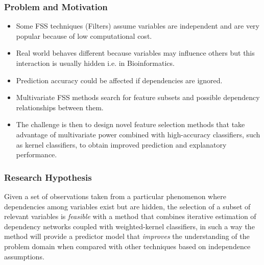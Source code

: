 \begin{frame}
\frametitle{Problem and Motivation}
\begin{itemize}
	\item Some FSS techniques (Filters) assume variables are independent and are very popular because of low computational cost.
	\item Real world behaves different because variables may influence others but this interaction is usually hidden i.e. in Bioinformatics.
	\item Prediction accuracy could be affected if dependencies are ignored.
	\item Multivariate FSS methods search for feature subsets and possible dependency relationships between them.
	\item The challenge is then to design novel feature selection methods that take advantage of multivariate power combined with high-accuracy classifiers, such as kernel classifiers, to obtain improved prediction and explanatory performance.
\end{itemize}
\end{frame}
\begin{frame}
\frametitle{Research Hypothesis}
\pause
\begin{center}
Given a set of observations taken from a particular phenomenon where dependencies among variables exist but are hidden, the selection of a subset of relevant variables is \emph{feasible} with a method that combines iterative estimation of dependency networks coupled with weighted-kernel classifiers, in such a way the method will provide a predictor model that \emph{improves} the understanding of the problem domain when compared with other techniques based on independence assumptions.
\end{center}
\end{frame}